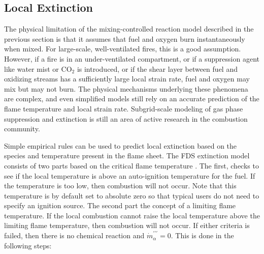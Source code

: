 \subsection{Local Extinction}

\label{extinction}

The physical limitation of the mixing-controlled reaction model described in the previous section is that it assumes that fuel and oxygen burn instantaneously when mixed. For large-scale, well-ventilated
fires, this is a good assumption. However, if a fire is in an
under-ventilated compartment, or if a suppression agent like water
mist or CO$_2$ is introduced, or if the shear layer between fuel and oxidizing streams
has a sufficiently large local strain rate,
fuel and oxygen may mix but may not burn.
The physical mechanisms underlying these phenomena are complex, and
even simplified models still rely on an accurate prediction
of the flame temperature and local strain rate.
Subgrid-scale modeling of gas phase suppression and
extinction is still an area of active research in the combustion
community.

Simple empirical rules can be used to predict local
extinction based on the species and temperature present in the flame sheet.  The FDS extinction model consists of two parts based on the critical flame temperature \cite{SFPE:Beyler}. The first, checks to see if the local temperature is above an auto-ignition temperature for the fuel.  If the temperature is too low, then combustion will not occur.  Note that this temperature is by default set to absolute zero so that typical users do not need to specify an ignition source.  The second part the concept of a limiting flame temperature.  If the local combustion cannot raise the local temperature above the limiting flame temperature, then combustion will not occur. If either criteria is failed, then there is no chemical reaction and $\dot{m}^{\prime\prime\prime}_{\alpha}=0$. This is done in the following steps:


